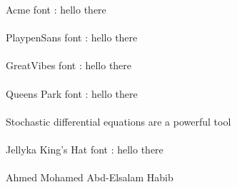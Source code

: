 \documentclass[]{article}
\begin{document}
{\fontsize{50pt}{0}
    \selectfont\Acmefont
    Acme font : hello there
    \\\\
    \selectfont\handfont 
    PlaypenSans font : hello there
    \\\\
    \selectfont\fancyfont 
    GreatVibes font : hello there
    \\\\
    \selectfont\Queenfont 
    Queens Park font : hello there
    \\\\
    Stochastic differential equations are a powerful tool
    \\\\
    \selectfont\jellykingfont 
    Jellyka King's Hat font : hello there
    \\\\
    Ahmed Mohamed Abd-Elsalam Habib
}
\end{document}
